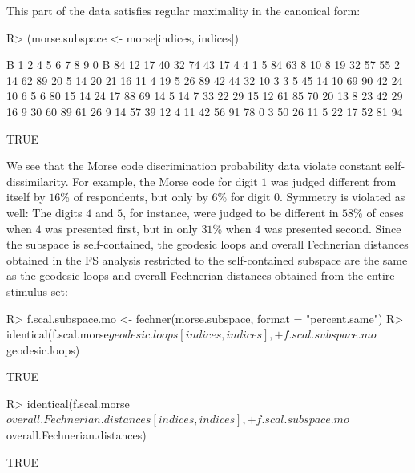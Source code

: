 \documentclass[nojss]{jss}
\begin{document}
This part of the  data satisfies regular maximality in the canonical form:
\begin{CodeChunk}
\begin{CodeInput}
R> (morse.subspace <- morse[indices, indices])
\end{CodeInput}
\begin{CodeOutput}
   B  1  2  4  5  6  7  8  9  0
B 84 12 17 40 32 74 43 17  4  4
1  5 84 63  8 10  8 19 32 57 55
2 14 62 89 20  5 14 20 21 16 11
4 19  5 26 89 42 44 32 10  3  3
5 45 14 10 69 90 42 24 10  6  5
6 80 15 14 24 17 88 69 14  5 14
7 33 22 29 15 12 61 85 70 20 13
8 23 42 29 16  9 30 60 89 61 26
9 14 57 39 12  4 11 42 56 91 78
0  3 50 26 11  5 22 17 52 81 94
\end{CodeOutput}
\begin{CodeOutput}
[1] TRUE
\end{CodeOutput}
\end{CodeChunk}
We see that the Morse code discrimination probability data violate constant self-dissimilarity.
For example, the Morse code for digit $1$ was judged different from itself by $16$\% of respondents, but only by 
$6$\% for digit $0$. Symmetry is violated as well: The digits $4$ and $5$, for instance, were judged to be different 
in $58$\% of cases when $4$ was presented first, but in only $31$\% when $4$ was presented second.
Since the subspace is self-contained, the geodesic loops and overall Fechnerian distances obtained in the FS 
analysis restricted to the self-contained subspace are the same as the geodesic loops and overall Fechnerian distances 
obtained from the entire stimulus set:
\begin{CodeChunk}
\begin{CodeInput}
R> f.scal.subspace.mo <- fechner(morse.subspace, format = "percent.same")
R> identical(f.scal.morse$geodesic.loops[indices, indices],
+    f.scal.subspace.mo$geodesic.loops)
\end{CodeInput}
\begin{CodeOutput}
[1] TRUE
\end{CodeOutput}
\begin{CodeInput}
R> identical(f.scal.morse$overall.Fechnerian.distances[indices, indices],
+    f.scal.subspace.mo$overall.Fechnerian.distances)
\end{CodeInput}
\begin{CodeOutput}
[1] TRUE
\end{CodeOutput}
\end{CodeChunk}
\end{document}
